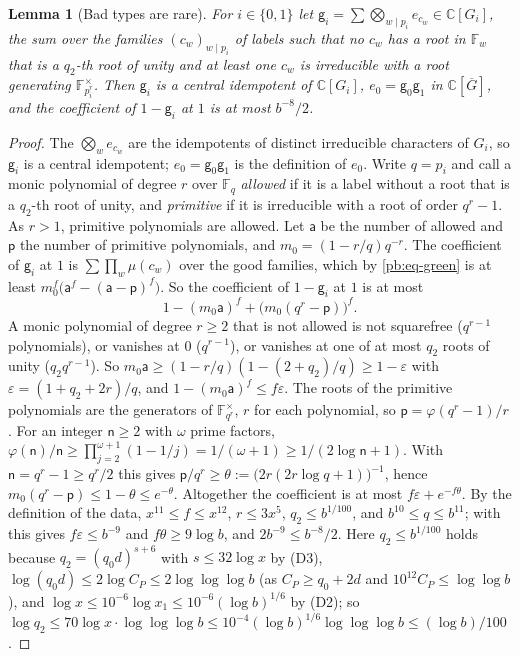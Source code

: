 \documentclass[10pt]{amsart}
\newtheorem{lemma}[theorem]{Lemma}
\theoremstyle{definition}
\theoremstyle{remark}
\newcommand{\C}{\mathbb C}
\providecommand{\auF}{\mathbb F}
\providecommand{\auG}{\overline G}
\begin{document}
\begin{lemma}[Bad types are rare]\label{pb:bad}
For $i\in\{0,1\}$ let $\mathsf g_i=\sum\bigotimes_{w\mid p_i}e_{c_w}\in\C[G_i]$, the sum over the
families $(c_w)_{w\mid p_i}$ of labels such that no $c_w$ has a root in $\auF_w$ that is a
$q_2$-th root of unity and at least one $c_w$ is irreducible with a root generating $\auF_{p_i^r}^
\times$. Then $\mathsf g_i$ is a central idempotent of $\C[G_i]$, $e_0=\mathsf g_0\mathsf g_1$ in
$\C[\auG]$, and the coefficient of $1-\mathsf g_i$ at $1$ is at most $b^{-8}/2$.
\end{lemma}
\begin{proof}
The $\bigotimes_we_{c_w}$ are the idempotents of distinct irreducible characters of $G_i$, so
$\mathsf g_i$ is a central idempotent; $e_0=\mathsf g_0\mathsf g_1$ is the definition of $e_0$.
Write $q=p_i$ and call a monic polynomial of degree $r$ over $\auF_q$ \emph{allowed} if it is a
label without a root that is a $q_2$-th root of unity, and \emph{primitive} if it is irreducible
with a root of order $q^r-1$. As $r>1$, primitive polynomials are allowed. Let $\mathsf a$ be the
number of allowed and $\mathsf p$ the number of primitive polynomials, and $m_0=(1-r/q)q^{-r}$. The
coefficient of $\mathsf g_i$ at $1$ is $\sum\prod_w\mu(c_w)$ over the good families, which by
\eqref{pb:eq-green} is at least $m_0^f\bigl(\mathsf a^f-(\mathsf a-\mathsf p)^f\bigr)$. So the
coefficient of $1-\mathsf g_i$ at $1$ is at most
\[
1-(m_0\mathsf a)^f+\bigl(m_0(q^r-\mathsf p)\bigr)^f .
\]
A monic polynomial of degree $r\ge2$ that is not allowed is not squarefree ($q^{r-1}$
polynomials), or vanishes at $0$ ($q^{r-1}$), or vanishes at one of at most $q_2$ roots of unity
($q_2q^{r-1}$). So $m_0\mathsf a\ge(1-r/q)(1-(2+q_2)/q)\ge1-\varepsilon$ with $\varepsilon=(1+q_2+
2r)/q$, and $1-(m_0\mathsf a)^f\le f\varepsilon$. The roots of the primitive polynomials are the
generators of $\auF_{q^r}^\times$, $r$ for each polynomial, so $\mathsf p=\varphi(q^r-1)/r$. For an
integer $\mathsf n\ge2$ with $\omega$ prime factors, $\varphi(\mathsf n)/\mathsf n\ge\prod_{j=2}^{
\omega+1}(1-1/j)=1/(\omega+1)\ge1/(2\log\mathsf n+1)$. With $\mathsf n=q^r-1\ge q^r/2$ this gives
$\mathsf p/q^r\ge\theta:=\bigl(2r(2r\log q+1)\bigr)^{-1}$, hence $m_0(q^r-\mathsf p)\le1-\theta\le
e^{-\theta}$. Altogether the coefficient is at most $f\varepsilon+e^{-f\theta}$. By the definition
of the data, $x^{11}\le f\le x^{12}$, $r\le3x^5$, $q_2\le b^{1/100}$, and
$b^{10}\le q\le b^{11}$; with {\cite[(36)]{P46}} this gives $f\varepsilon\le b^{-9}$ and
$f\theta\ge9\log b$, and $2b^{-9}\le b^{-8}/2$. Here $q_2\le b^{1/100}$ holds because
$q_2=(q_0d)^{s+6}$ with $s\le32\log x$ by (D3), $\log(q_0d)\le2\log C_P\le2\log\log\log b$ (as
$C_P\ge q_0+2d$ and $10^{12}C_P\le\log\log b$), and $\log x\le10^{-6}\log x_1\le10^{-6}(\log b)^{1/6}$
by (D2); so $\log q_2\le70\log x\cdot\log\log\log b\le10^{-4}(\log b)^{1/6}\log\log\log b\le
(\log b)/100$.
\end{proof}
\end{document}
